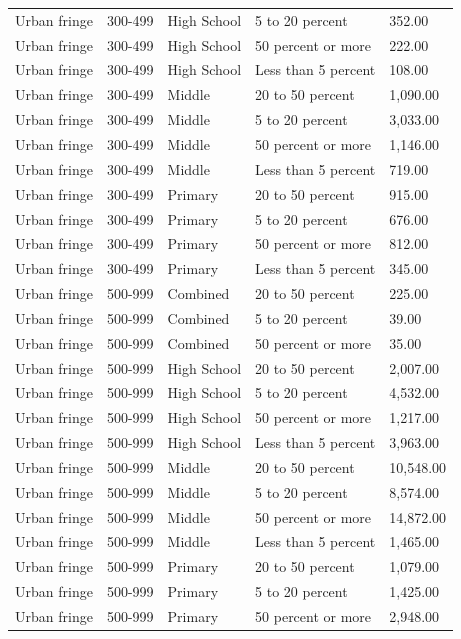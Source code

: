 \documentclass[
  man, fleqn, noextraspace]{apa6}
\begin{document}
\begin{table}[tbp]
\begin{center}
\begin{threeparttable}
\begin{tabular}{lllll}
Urban fringe & 300-499 & High School & 5 to 20 percent & 352.00\\
Urban fringe & 300-499 & High School & 50 percent or more & 222.00\\
Urban fringe & 300-499 & High School & Less than 5 percent & 108.00\\
Urban fringe & 300-499 & Middle & 20 to 50 percent & 1,090.00\\
Urban fringe & 300-499 & Middle & 5 to 20 percent & 3,033.00\\
Urban fringe & 300-499 & Middle & 50 percent or more & 1,146.00\\
Urban fringe & 300-499 & Middle & Less than 5 percent & 719.00\\
Urban fringe & 300-499 & Primary & 20 to 50 percent & 915.00\\
Urban fringe & 300-499 & Primary & 5 to 20 percent & 676.00\\
Urban fringe & 300-499 & Primary & 50 percent or more & 812.00\\
Urban fringe & 300-499 & Primary & Less than 5 percent & 345.00\\
Urban fringe & 500-999 & Combined & 20 to 50 percent & 225.00\\
Urban fringe & 500-999 & Combined & 5 to 20 percent & 39.00\\
Urban fringe & 500-999 & Combined & 50 percent or more & 35.00\\
Urban fringe & 500-999 & High School & 20 to 50 percent & 2,007.00\\
Urban fringe & 500-999 & High School & 5 to 20 percent & 4,532.00\\
Urban fringe & 500-999 & High School & 50 percent or more & 1,217.00\\
Urban fringe & 500-999 & High School & Less than 5 percent & 3,963.00\\
Urban fringe & 500-999 & Middle & 20 to 50 percent & 10,548.00\\
Urban fringe & 500-999 & Middle & 5 to 20 percent & 8,574.00\\
Urban fringe & 500-999 & Middle & 50 percent or more & 14,872.00\\
Urban fringe & 500-999 & Middle & Less than 5 percent & 1,465.00\\
Urban fringe & 500-999 & Primary & 20 to 50 percent & 1,079.00\\
Urban fringe & 500-999 & Primary & 5 to 20 percent & 1,425.00\\
Urban fringe & 500-999 & Primary & 50 percent or more & 2,948.00\\

\end{tabular}
\end{threeparttable}
\end{center}
\end{table}
\end{document}
